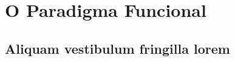 \chapter{O Paradigma Funcional}

\section{Aliquam vestibulum fringilla lorem}

\lipsum[1]

\lipsum[2-3]